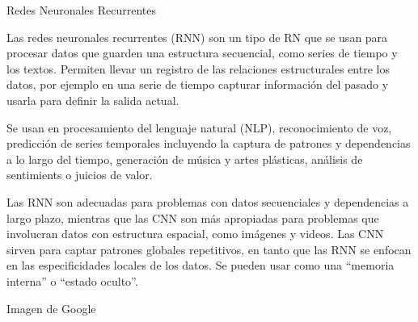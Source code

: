\documentclass[10pd,hyperref={colorlinks=true}]{beamer}
\begin{document}

 \begin{frame}{Redes Neuronales Recurrentes}

Las redes neuronales recurrentes (RNN) son un tipo de RN que se usan 
para procesar datos que guarden una estructura secuencial, como series 
de tiempo y los textos. Permiten llevar un registro de las relaciones 
estructurales entre los datos, por ejemplo en una serie de tiempo 
capturar información del pasado y usarla para definir la salida actual.

Se usan en procesamiento del lenguaje natural (NLP), reconocimiento de 
voz, predicción de series temporales incluyendo la captura de patrones y 
dependencias a lo largo del tiempo, generación de música y artes 
plásticas, análisis de sentimients o juicios de valor.

Las RNN son adecuadas para problemas con datos secuenciales y 
dependencias a largo plazo, mientras que las CNN son más apropiadas para 
problemas que involucran datos con estructura espacial, como imágenes y 
videos. Las CNN sirven para captar patrones globales repetitivos, en 
tanto que las RNN se enfocan en las especificidades locales de los 
datos. Se pueden usar como una ``memoria interna'' o ``estado oculto''.

 \end{frame}


 \begin{frame}{}

 \vfill
 \centerline{}
 \vfill
 \centerline{\tiny Imagen de Google}
 \vfill

 \end{frame}

\end{document}
